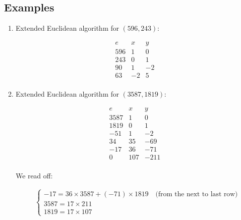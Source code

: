 \documentclass[11pt, draft]{article}
\begin{document}
\subsection{Examples}

\begin{enumerate}
    \item Extended Euclidean algorithm for \((596, 243)\):

          \[
              \begin{array}{c|c|c}
                  e   & x  & y  \\
                  \hline
                  596 & 1  & 0  \\
                  243 & 0  & 1  \\
                  90  & 1  & -2 \\
                  63  & -2 & 5  \\
              \end{array}
          \]

    \item Extended Euclidean algorithm for \((3587, 1819)\):

          \[
              \begin{array}{c|c|c}
                  e    & x   & y    \\
                  \hline
                  3587 & 1   & 0    \\
                  1819 & 0   & 1    \\
                  -51  & 1   & -2   \\
                  34   & 35  & -69  \\
                  -17  & 36  & -71  \\
                  0    & 107 & -211 \\
              \end{array}
          \]

          We read off:

          \[
              \begin{aligned}
                   & \left\{
                  \begin{array}{l}
                      -17 = 36 \times 3587 + (-71) \times 1819 \quad \text{(from the next to last row)} \\
                      3587 = 17 \times 211                                                              \\
                      1819 = 17 \times 107
                  \end{array}
                  \right.
              \end{aligned}
          \]
\end{enumerate}
\end{document}
